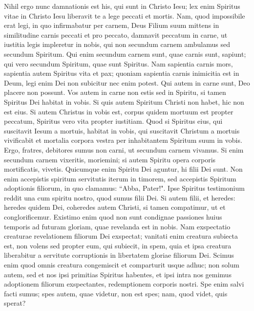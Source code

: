 \begin{biblechapter}  
\verse Nihil ergo nunc damnationis est his, qui sunt in Christo Iesu; 
\verse lex enim Spiritus vitae in Christo Iesu liberavit te a lege peccati et mortis. 
\verse Nam, quod impossibile erat legi, in quo infirmabatur per carnem, Deus Filium suum mittens in similitudine carnis peccati et pro peccato, damnavit peccatum in carne, 
\verse ut iustitia legis impleretur in nobis, qui non secundum carnem ambulamus sed secundum Spiritum. 
\verse Qui enim secundum carnem sunt, quae carnis sunt, sapiunt; qui vero secundum Spiritum, quae sunt Spiritus. 
\verse Nam sapientia carnis mors, sapientia autem Spiritus vita et pax; 
\verse quoniam sapientia carnis inimicitia est in Deum, legi enim Dei non subicitur nec enim potest. 
\verse Qui autem in carne sunt, Deo placere non possunt. 
\verse Vos autem in carne non estis sed in Spiritu, si tamen Spiritus Dei habitat in vobis. Si quis autem Spiritum Christi non habet, hic non est eius. 
\verse Si autem Christus in vobis est, corpus quidem mortuum est propter peccatum, Spiritus vero vita propter iustitiam. 
\verse Quod si Spiritus eius, qui suscitavit Iesum a mortuis, habitat in vobis, qui suscitavit Christum a mortuis vivificabit et mortalia corpora vestra per inhabitantem Spiritum suum in vobis. 
\verse Ergo, fratres, debitores sumus non carni, ut secundum carnem vivamus. 
\verse Si enim secundum carnem vixeritis, moriemini; si autem Spiritu opera corporis mortificatis, vivetis. 
\verse Quicumque enim Spiritu Dei aguntur, hi filii Dei sunt. 
\verse Non enim accepistis spiritum servitutis iterum in timorem, sed accepistis Spiritum adoptionis filiorum, in quo clamamus: “Abba, Pater!". 
\verse Ipse Spiritus testimonium reddit una cum spiritu nostro, quod sumus filii Dei. 
\verse Si autem filii, et heredes: heredes quidem Dei, coheredes autem Christi, si tamen compatimur, ut et conglorificemur. 
\verse Existimo enim quod non sunt condignae passiones huius temporis ad futuram gloriam, quae revelanda est in nobis. 
\verse Nam exspectatio creaturae revelationem filiorum Dei exspectat; 
\verse vanitati enim creatura subiecta est, non volens sed propter eum, qui subiecit, in spem, 
\verse quia et ipsa creatura liberabitur a servitute corruptionis in libertatem gloriae filiorum Dei. 
\verse Scimus enim quod omnis creatura congemiscit et comparturit usque adhuc; 
\verse non solum autem, sed et nos ipsi primitias Spiritus habentes, et ipsi intra nos gemimus adoptionem filiorum exspectantes, redemptionem corporis nostri. 
\verse Spe enim salvi facti sumus; spes autem, quae videtur, non est spes; nam, quod videt, quis sperat? 

\end{biblechapter}
